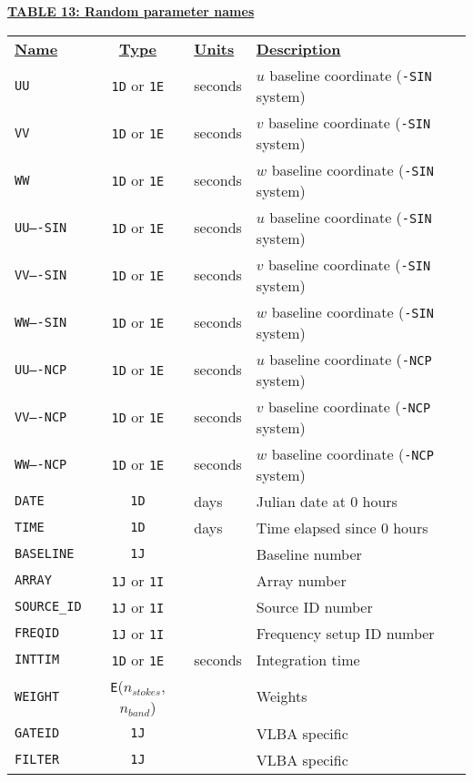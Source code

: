\documentclass[twoside]{article}
\newcommand{\Hi}[1]{\textcolor{hicol}{#1}}
\newcommand{\nstokes}{$n_{stokes}$}
\newcommand{\nband}{$n_{band}$}
\begin{document}
\begin{center}
\underline{\bf{TABLE \Hi{13}: Random parameter names}}\\
\begin{tabular}{lcll}
\noalign{\vspace{2pt}}
\underline{{\bf Name\vphantom{y}}} & \underline{\bf{Type}} &
   \underline{{\bf Units\vphantom{y}}} & \underline{\bf{Description}} \\
\noalign{\vspace{2pt}}
{\tt UU}       & {\tt 1D} or {\tt 1E} & seconds & $u$ baseline coordinate ({\tt -SIN} system) \\
{\tt VV}       & {\tt 1D} or {\tt 1E} & seconds & $v$ baseline coordinate ({\tt -SIN} system) \\
{\tt WW}       & {\tt 1D} or {\tt 1E} & seconds & $w$ baseline coordinate ({\tt -SIN} system) \\
{\tt UU--\Hi{-}SIN} & {\tt 1D} or {\tt 1E} & seconds & $u$ baseline coordinate ({\tt -SIN} system) \\
{\tt VV--\Hi{-}SIN} & {\tt 1D} or {\tt 1E} & seconds & $v$ baseline coordinate ({\tt -SIN} system) \\
{\tt WW--\Hi{-}SIN} & {\tt 1D} or {\tt 1E} & seconds & $w$ baseline coordinate ({\tt -SIN} system) \\
{\tt UU--\Hi{-}NCP} & {\tt 1D} or {\tt 1E} & seconds & $u$ baseline coordinate ({\tt -NCP} system) \\
{\tt VV--\Hi{-}NCP} & {\tt 1D} or {\tt 1E} & seconds & $v$ baseline coordinate ({\tt -NCP} system) \\
{\tt WW--\Hi{-}NCP} & {\tt 1D} or {\tt 1E} & seconds & $w$ baseline coordinate ({\tt -NCP} system) \\
{\tt DATE}          & {\tt 1D}             & days    & Julian date at 0 hours \\
{\tt TIME}          & {\tt 1D}             & days    & Time elapsed since 0 hours \\
{\tt BASELINE}      & {\tt 1J}             &         & Baseline number \\
{\tt ARRAY}         & {\tt 1J} or {\tt 1I} &         & Array number \\
{\tt SOURCE\_ID}    & {\tt 1J} or {\tt 1I} &         & Source ID number \\
{\tt FREQID}        & {\tt 1J} or {\tt 1I} &         & Frequency \Hi{setup} ID number \\
{\tt INTTIM}        & {\tt 1D} or {\tt 1E} & seconds & Integration time \\
{\tt WEIGHT}        & {\tt E}(\nstokes,\nband) &     & Weights \\
{\tt GATEID}        & {\tt 1J}             &         & VLBA specific \\
{\tt FILTER}        & {\tt 1J}             &         & VLBA specific
\end{tabular}
\end{center}
\end{document}
